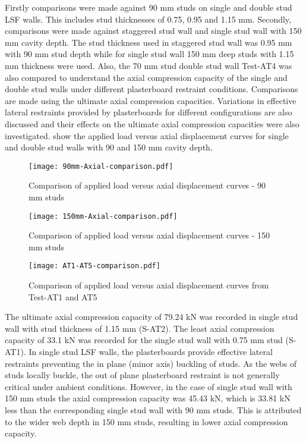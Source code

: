 Firstly comparisons were made against 90 mm studs on single and double stud LSF walls. This includes stud thicknesses of 0.75, 0.95 and 1.15 mm. Secondly, comparisons were made against staggered stud wall and single stud wall with 150 mm cavity depth. The stud thickness used in staggered stud wall was 0.95 mm with 90 mm stud depth while for single stud wall 150 mm deep studs with 1.15 mm thickness were used. Also, the 70 mm stud double stud wall Test-AT4 was also compared to understand the axial compression capacity of the single and double stud walls under different plasterboard restraint conditions. Comparisons are made using the ultimate axial compression capacities. Variations in effective lateral restraints provided by plasterboards for different configurations are also discussed and their effects on the ultimate axial compression capacities were also investigated.  show the applied load versus axial displacement curves for single and double stud walls with 90 and 150 mm cavity depth.
\begin{figure}[!htbp]
	\centering
			\texttt{[image: 90mm-Axial-comparison.pdf]}\\
		\caption{Comparison of applied load versus axial displacement curves - 90 mm studs}
		\label{fig:90mm-comparison-ambient}
\end{figure}
\begin{figure}[!htbp]
	\centering
			\texttt{[image: 150mm-Axial-comparison.pdf]}\\
		\caption{Comparison of applied load versus axial displacement curves - 150 mm studs}
		\label{fig:150mm-comparison-ambient}
\end{figure}
\begin{figure}[!htbp]
	\centering
			\texttt{[image: AT1-AT5-comparison.pdf]}\\
		\caption{Comparison of applied load versus axial displacement curves from Test-AT1 and AT5}
		\label{fig:AT1-AT5-comparison-ambient}
\end{figure}

The ultimate axial compression capacity of 79.24 kN was recorded in single stud wall with stud thickness of 1.15 mm (S-AT2). The least axial compression capacity of 33.1 kN was recorded for the single stud wall with 0.75 mm stud (S-AT1). In single stud LSF walls, the plasterboards provide effective lateral restraints preventing the in plane (minor axis) buckling of studs. As the webs of studs locally buckle, the out of plane plasterboard restraint is not generally critical under ambient conditions. However, in the case of single stud wall with 150 mm studs the axial compression capacity was 45.43 kN, which is 33.81 kN less than the corresponding single stud wall with 90 mm studs. This is attributed to the wider web depth in 150 mm studs, resulting in lower axial compression capacity.

